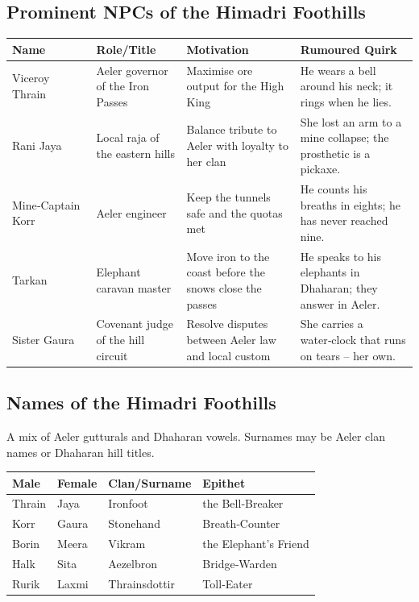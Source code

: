 \documentclass[11pt]{book}
\begin{document}
\subsection*{Prominent NPCs of the Himadri Foothills}
\begin{longtable}{|p{}|p{}|p{}|p{}|}
\hline
\textbf{Name} & \textbf{Role/Title} & \textbf{Motivation} & \textbf{Rumoured Quirk} \\
\hline
Viceroy Thrain & Aeler governor of the Iron Passes & Maximise ore output for the High King & He wears a bell around his neck; it rings when he lies. \\
\hline
Rani Jaya & Local raja of the eastern hills & Balance tribute to Aeler with loyalty to her clan & She lost an arm to a mine collapse; the prosthetic is a pickaxe. \\
\hline
Mine‑Captain Korr & Aeler engineer & Keep the tunnels safe and the quotas met & He counts his breaths in eights; he has never reached nine. \\
\hline
Tarkan & Elephant caravan master & Move iron to the coast before the snows close the passes & He speaks to his elephants in Dhaharan; they answer in Aeler. \\
\hline
Sister Gaura & Covenant judge of the hill circuit & Resolve disputes between Aeler law and local custom & She carries a water‑clock that runs on tears – her own. \\
\hline
\end{longtable}

\subsection*{Names of the Himadri Foothills}
A mix of Aeler gutturals and Dhaharan vowels. Surnames may be Aeler clan names or Dhaharan hill titles.

\begin{longtable}{|p{}|p{}|p{}|p{}|}
\hline
\textbf{Male} & \textbf{Female} & \textbf{Clan/Surname} & \textbf{Epithet} \\
\hline
Thrain & Jaya & Ironfoot & the Bell‑Breaker \\
\hline
Korr & Gaura & Stonehand & Breath‑Counter \\
\hline
Borin & Meera & Vikram & the Elephant’s Friend \\
\hline
Halk & Sita & Aezelbron & Bridge‑Warden \\
\hline
Rurik & Laxmi & Thrainsdottir & Toll‑Eater \\
\hline
\end{longtable}
\end{document}
